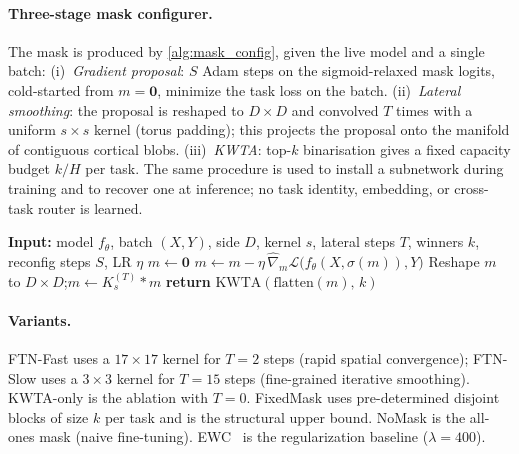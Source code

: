 \documentclass{article}
\theoremstyle{plain}
\theoremstyle{remark}
\begin{document}
\paragraph{Three-stage mask configurer.}
The mask is produced by \cref{alg:mask_config}, given the live model and a single batch:
(i)~\emph{Gradient proposal}: $S$ Adam steps on the sigmoid-relaxed mask logits, cold-started from $m=\mathbf{0}$, minimize the task loss on the batch.
(ii)~\emph{Lateral smoothing}: the proposal is reshaped to $D\times D$ and convolved $T$ times with a uniform $s\times s$ kernel (torus padding); this projects the proposal onto the manifold of contiguous cortical blobs.
(iii)~\emph{KWTA}: top-$k$ binarisation gives a fixed capacity budget $k/H$ per task.
The same procedure is used to install a subnetwork during training and to recover one at inference; no task identity, embedding, or cross-task router is learned.

\begin{algorithm}[t]
\caption{\textsc{SmoothKWTA} mask configurer}
\label{alg:mask_config}
\begin{algorithmic}[1]
\STATE \textbf{Input:} model $f_\theta$, batch $(X,Y)$, side $D$, kernel $s$, lateral steps $T$, winners $k$, reconfig steps $S$, LR $\eta$
\STATE $m\leftarrow\mathbf{0}$
  \STATE $m\leftarrow m-\eta\,\widehat\nabla_m\mathcal{L}\bigl(f_\theta(X,\sigma(m)),Y\bigr)$
\ENDFOR
\STATE Reshape $m$ to $D\times D$;\quad $m\leftarrow K_s^{(T)}*m$
\STATE \textbf{return} $\mathrm{KWTA}(\mathrm{flatten}(m),\,k)$
\end{algorithmic}
\end{algorithm}

\paragraph{Variants.}
FTN-Fast uses a $17\times 17$ kernel for $T{=}2$ steps (rapid spatial convergence); FTN-Slow uses a $3\times 3$ kernel for $T{=}15$ steps (fine-grained iterative smoothing). KWTA-only is the ablation with $T{=}0$. FixedMask uses pre-determined disjoint blocks of size $k$ per task and is the structural upper bound. NoMask is the all-ones mask (naive fine-tuning). EWC~\citep{kirkpatrick2017overcoming} is the regularization baseline ($\lambda{=}400$).
\end{document}
